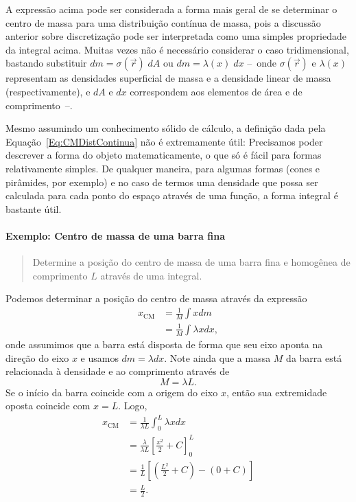 A expressão acima pode ser considerada a forma mais geral de se determinar o centro de massa para uma distribuição contínua de massa, pois a discussão anterior sobre discretização pode ser interpretada como uma simples propriedade da integral acima. Muitas vezes não é necessário considerar o caso tridimensional, bastando substituir $dm = \sigma(\vec{r}) \; dA$ ou $dm = \lambda(x) \; dx$ --~onde $\sigma(\vec{r})$ e $\lambda(x)$ representam as densidades superficial de massa e a densidade linear de massa (respectivamente), e $dA$ e $dx$ correspondem aos elementos de área e de comprimento~--.

Mesmo assumindo um conhecimento sólido de cálculo, a definição dada pela Equação~\eqref{Eq:CMDistContinua} não é extremamente útil: Precisamos poder descrever a forma do objeto matematicamente, o que só é fácil para formas relativamente simples. De qualquer maneira, para algumas formas (cones e pirâmides, por exemplo) e no caso de termos uma densidade que possa ser calculada para cada ponto do espaço através de uma função, a forma integral é bastante útil.

\paragraph{Exemplo: Centro de massa de uma barra fina}

\begin{quote}
    Determine a posição do centro de massa de uma barra fina e homogênea de comprimento $L$ através de uma integral.
\end{quote}

Podemos determinar a posição do centro de massa através da expressão
\begin{align}
    x_{\text{CM}} &= \frac{1}{M} \int x dm \\
    &= \frac{1}{M} \int \lambda x dx,
\end{align}
%
onde assumimos que a barra está disposta de forma que seu eixo aponta na direção do eixo $x$ e usamos $dm = \lambda dx$. Note ainda que a massa $M$ da barra está relacionada à densidade e ao comprimento através de
\begin{equation}
    M = \lambda L.
\end{equation}
%
Se o início da barra coincide com a origem do eixo $x$, então sua extremidade oposta coincide com $x = L$. Logo,
\begin{align}
    x_{\text{CM}} &= \frac{1}{\lambda L} \int_0^L \lambda x dx \\
    &= \frac{\lambda}{\lambda L} \left[\frac{x^2}{2} + C\right]_0^L \\
    &= \frac{1}{L} \left[\left(\frac{L^2}{2} + C\right) - (0 + C)\right] \\
    &= \frac{L}{2}.
\end{align}

